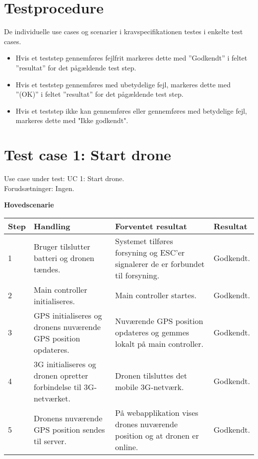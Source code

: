 \vspace{-0.5cm}
\section*{Testprocedure}
\vspace{-0.5cm}
De individuelle use cases og scenarier i kravspecifikationen testes i enkelte test cases. 

\begin{itemize}
	\item Hvis et teststep gennemføres fejlfrit markeres dette med ”Godkendt” i feltet ”resultat” for det pågældende test step.

	\item Hvis et teststep gennemføres med ubetydelige fejl, markeres dette med ”(OK)” i feltet ”resultat” for det pågældende test step.
	
	\item Hvis et teststep ikke kan gennemføres eller gennemføres med betydelige fejl, markeres dette med "Ikke godkendt".
	
\end{itemize}

\newpage

\section{Test case 1: Start drone}
Use case under test: UC 1: Start drone.\\
Forudsætninger:	Ingen.

\textbf{Hovedscenarie}
\begin{table}[H]
	\centering
		\begin{tabular}{|l|p{5 cm}|p{5 cm}|p{2.5 cm}|} 
		\hline
			\textbf{Step} & \textbf{Handling} & \textbf{Forventet resultat} & \textbf{Resultat} \\ \hline
			1 & Bruger tilslutter batteri og dronen tændes. & Systemet tilføres forsyning og ESC'er signalerer de er \newline forbundet til forsyning. & Godkendt.   \\ \hline
			2 & Main controller initialiseres. & Main controller startes. & Godkendt.   \\ \hline
			3 & GPS initialiseres og dronens nuværende GPS position \newline opdateres. & Nuværende GPS position \newline opdateres og gemmes lokalt på main controller. & Godkendt.   \\ \hline
			4 & 3G initialiseres og dronen opretter forbindelse til \newline 3G-netværket. & Dronen tilsluttes det mobile \newline 3G-netværk. &  Godkendt. \\ \hline
			5 & Dronens nuværende GPS \newline position sendes til server. & På webapplikation vises \newline drones nuværende position og at dronen er online. & Godkendt. \\ \hline
		\end{tabular}
\end{table}

